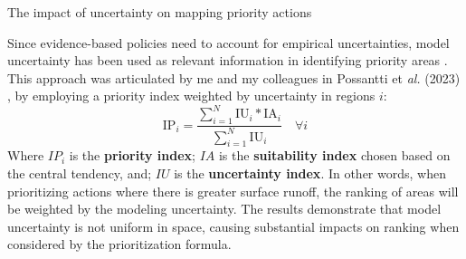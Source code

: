 \documentclass[./main_en.tex]{subfiles}
\begin{document}
\begin{simplebox}[
    float=ht!,
    label={highlight_uncertainty_maps},
    nameref={Uncertainty Maps}
    ]{The impact of uncertainty on mapping priority actions}
\begin{minipage}[t]{\linewidth}
    \par Since evidence-based policies need to account for empirical uncertainties, model uncertainty has been used as relevant information in identifying priority areas \cite{EVENSON2021}. This approach was articulated by me and my colleagues in Possantti et \textit{al.} (2023) \cite{Possantti2023a}, by employing a priority index weighted by uncertainty in regions $i$:
    \begin{equation}
        \label{eq:ip}
        \text{IP}_{i} = \frac{\sum_{i=1}^{N}\text{IU}_{i} * \text{IA}_{i} }{\sum_{i=1}^{N}\text{IU}_{i}} \quad \forall i
    \end{equation}
    Where $IP_{i}$ is the \textbf{priority index}; $IA$ is the \textbf{suitability index} chosen based on the central tendency, and; $IU$ is the \textbf{uncertainty index}. In other words, when prioritizing actions where there is greater surface runoff, the ranking of areas will be weighted by the modeling uncertainty. The results demonstrate that model uncertainty is not uniform in space, causing substantial impacts on ranking when considered by the prioritization formula.    
    
    \end{minipage}
\label{box:uncert}
\normalsize
\end{simplebox}
\end{document}

